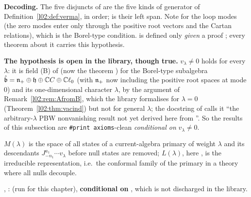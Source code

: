 \begin{dictionary}
\textbf{Decoding.} The five disjuncts of  are the five kinds of generator of
Definition~\ref{l02:def:verma}, in order;  is their left span. Note  for the
loop modes (the zero modes enter only through the positive root vectors and the Cartan relations),
which is the Borel-type condition.  is defined only \emph{given} a proof
; every theorem about it carries this hypothesis.

\textbf{The hypothesis is open in the library, though true.} $v_\lambda\ne0$ holds for every $\lambda$: it is
field (B) of  (now the theorem \allowbreak{}\allowbreak{}) for the Borel-type subalgebra $\hat{\mathfrak b} = \mathfrak{n}_+\oplus\mathfrak h\oplus{\mathbb{C}} C\oplus{\mathbb{C}}\ell_0$
(with $\mathfrak{n}_+$ now including the positive root spaces at mode $0$) and its one-dimensional character
$\lambda$, by the argument of Remark~\ref{l02:rem:AfromB}, which the library formalises for $\lambda = 0$
(Theorem~\ref{l02:thm:vacind}) but not for general $\lambda$; the
docstring of \allowbreak{}\allowbreak{}\allowbreak{}\allowbreak{}\allowbreak{}\allowbreak{} calls it ``the arbitrary-$\lambda$
PBW nonvanishing result not yet derived here from \allowbreak{}''. So the results of this
subsection are \texttt{\#print axioms}-clean \emph{conditional on} $v_\lambda\ne0$.
\end{dictionary}

\begin{physics}
$M(\lambda)$ is the space of all states of a current-algebra primary of weight $\lambda$ and its
descendants $J^{a_1}_{-n_1}\cdots v_\lambda$ before null states are removed; $L(\lambda)$, here
, is the irreducible representation, i.e.\ the conformal family of the primary in a
theory where all nulls decouple.
\end{physics}

\begin{status}
\allowbreak{}\allowbreak{}\allowbreak{}, \allowbreak{}\allowbreak{}\allowbreak{}\allowbreak{}\allowbreak{}:
 (run for this chapter), \textbf{conditional on}
, which is not discharged in the library.
\end{status}

